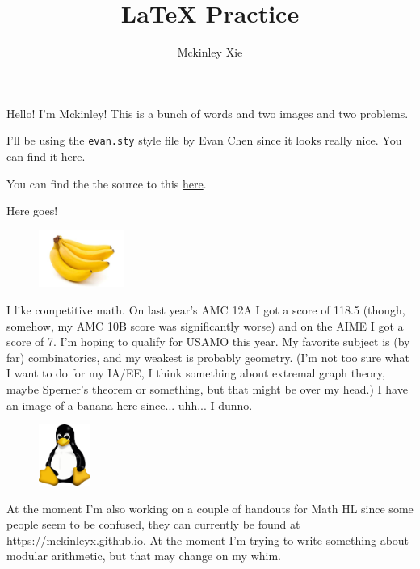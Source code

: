 \documentclass[a4paper]{scrartcl}
\author{Mckinley Xie}
\title{\LaTeX{} Practice}
\begin{document}
\maketitle

Hello! I'm Mckinley! This is a bunch of words and two images and two problems.

I'll be using the \texttt{evan.sty} style file by Evan Chen since it looks really nice.
You can find it \href{https://github.com/vEnhance/dotfiles/blob/main/texmf/tex/latex/evan/evan.sty}{here}.

You can find the the source to this \href{https://github.com/MckinleyX/ib-math-handouts/blob/master/practice.tex}{here}.

Here goes!


\begin{figure}
	\centering
	\includegraphics[width=0.25\textwidth]{banana}
\end{figure}

I like competitive math. On last year's AMC 12A I got a score of 118.5 (though, somehow, my AMC 10B score was significantly worse) and on the AIME I got a score of 7. I'm hoping to qualify for USAMO this year. My favorite subject is (by far) combinatorics, and my weakest is probably geometry. (I'm not too sure what I want to do for my IA/EE, I think something about extremal graph theory, maybe Sperner's theorem or something, but that might be over my head.) I have an image of a banana here since... uhh... I dunno.

\begin{figure}
	\centering
	\includegraphics[width=0.15\textwidth]{tux}
\end{figure}
\leavevmode

At the moment I'm also working on a couple of handouts for Math HL since some people seem to be confused, they can currently be found at \url{https://mckinleyx.github.io}. At the moment I'm trying to write something about modular arithmetic, but that may change on my whim.
\end{document}
